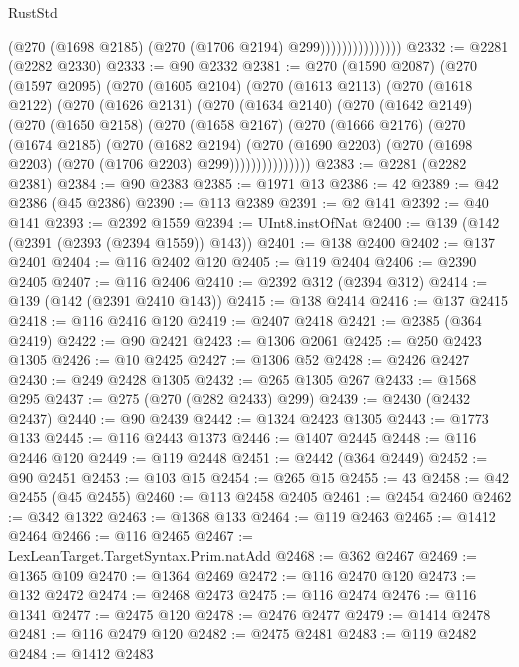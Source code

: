 \begin{lexlean}{RustStd}
\begin{coremodule}
                              (@270 (@1698 @2185) (@270 (@1706 @2194) @299)))))))))))))))
@2332 := @2281 (@2282 @2330)
@2333 := @90 @2332
@2381 := @270
    (@1590 @2087)
    (@270
      (@1597 @2095)
      (@270
        (@1605 @2104)
        (@270
          (@1613 @2113)
          (@270
            (@1618 @2122)
            (@270
              (@1626 @2131)
              (@270
                (@1634 @2140)
                (@270
                  (@1642 @2149)
                  (@270
                    (@1650 @2158)
                    (@270
                      (@1658 @2167)
                      (@270
                        (@1666 @2176)
                        (@270
                          (@1674 @2185)
                          (@270
                            (@1682 @2194)
                            (@270
                              (@1690 @2203)
                              (@270 (@1698 @2203) (@270 (@1706 @2203) @299)))))))))))))))
@2383 := @2281 (@2282 @2381)
@2384 := @90 @2383
@2385 := @1971 @13
@2386 := 42
@2389 := @42 @2386 (@45 @2386)
@2390 := @113 @2389
@2391 := @2 @141
@2392 := @40 @141
@2393 := @2392 @1559
@2394 := UInt8.instOfNat
@2400 := @139 (@142 (@2391 (@2393 (@2394 @1559)) @143))
@2401 := @138 @2400
@2402 := @137 @2401
@2404 := @116 @2402 @120
@2405 := @119 @2404
@2406 := @2390 @2405
@2407 := @116 @2406
@2410 := @2392 @312 (@2394 @312)
@2414 := @139 (@142 (@2391 @2410 @143))
@2415 := @138 @2414
@2416 := @137 @2415
@2418 := @116 @2416 @120
@2419 := @2407 @2418
@2421 := @2385 (@364 @2419)
@2422 := @90 @2421
@2423 := @1306 @2061
@2425 := @250 @2423 @1305
@2426 := @10 @2425
@2427 := @1306 @52
@2428 := @2426 @2427
@2430 := @249 @2428 @1305
@2432 := @265 @1305 @267
@2433 := @1568 @295
@2437 := @275 (@270 (@282 @2433) @299)
@2439 := @2430 (@2432 @2437)
@2440 := @90 @2439
@2442 := @1324 @2423 @1305
@2443 := @1773 @133
@2445 := @116 @2443 @1373
@2446 := @1407 @2445
@2448 := @116 @2446 @120
@2449 := @119 @2448
@2451 := @2442 (@364 @2449)
@2452 := @90 @2451
@2453 := @103 @15
@2454 := @265 @15
@2455 := 43
@2458 := @42 @2455 (@45 @2455)
@2460 := @113 @2458 @2405
@2461 := @2454 @2460
@2462 := @342 @1322
@2463 := @1368 @133
@2464 := @119 @2463
@2465 := @1412 @2464
@2466 := @116 @2465
@2467 := LexLeanTarget.TargetSyntax.Prim.natAdd
@2468 := @362 @2467
@2469 := @1365 @109
@2470 := @1364 @2469
@2472 := @116 @2470 @120
@2473 := @132 @2472
@2474 := @2468 @2473
@2475 := @116 @2474
@2476 := @116 @1341
@2477 := @2475 @120
@2478 := @2476 @2477
@2479 := @1414 @2478
@2481 := @116 @2479 @120
@2482 := @2475 @2481
@2483 := @119 @2482
@2484 := @1412 @2483

\end{coremodule}
\end{lexlean}
